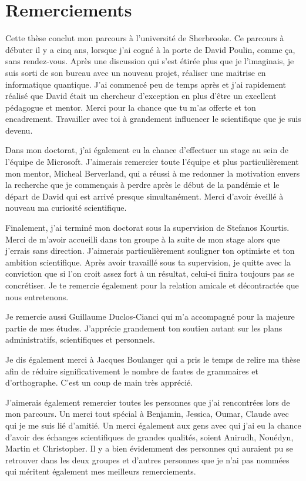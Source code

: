 \begin{comment}
\end{comment}

\chapter*{Remerciements}

Cette thèse conclut mon parcours à l'université de Sherbrooke.
Ce parcours à débuter il y a cinq ans,
lorsque j'ai cogné à la porte de David Poulin,
comme ça, sans rendez-vous.
Après une discussion qui s'est étirée plus que je l'imaginais,
je suis sorti de son bureau avec un nouveau projet, 
réaliser une maitrise en informatique quantique.
J'ai commencé peu de temps après et j'ai rapidement réalisé que David 
était un chercheur d'exception en plus d'être un excellent pédagogue et mentor.
Merci pour la chance que tu m'as offerte et ton encadrement.
Travailler avec toi à grandement influencer le scientifique que je suis devenu.

Dans mon doctorat,
j'ai également eu la chance d'effectuer un stage au sein de l'équipe de Microsoft.
J'aimerais remercier toute l'équipe et plus particulièrement mon mentor,
Micheal Berverland, qui a réussi à me redonner la motivation envers la recherche
que je commençais à perdre après le début de la pandémie et le départ de David qui est
arrivé presque simultanément.
Merci d'avoir éveillé à nouveau ma curiosité scientifique.

Finalement,
j'ai terminé mon doctorat sous la supervision de Stefanos Kourtis.
Merci de m'avoir accueilli dans ton groupe à la suite de mon stage alors que j'errais sans direction.
J'aimerais particulièrement souligner ton optimiste et ton ambition scientifique.
Après avoir travaillé sous ta supervision,
je quitte avec la conviction que si l'on croit assez fort à un résultat,
celui-ci finira toujours pas se concrétiser.
Je te remercie également pour la relation amicale et décontractée que nous entretenons.

Je remercie aussi Guillaume Duclos-Cianci qui m'a accompagné pour la majeure partie de mes études.
J'apprécie grandement ton soutien autant sur les plans administratifs, 
scientifiques et personnels.

Je dis également merci à Jacques Boulanger qui a pris le temps de relire ma thèse afin de réduire
significativement le nombre de fautes de grammaires et d'orthographe. C'est un coup de main très apprécié.  

J'aimerais également remercier toutes les personnes que j'ai rencontrées lors de mon parcours.
Un merci tout spécial à Benjamin, Jessica, Oumar, Claude avec qui
je me suis lié d'amitié.
Un merci également aux gens avec qui j'ai eu la chance d'avoir des échanges scientifiques
de grandes qualités, soient Anirudh, Nouédyn, Martin et Christopher.
Il y a bien évidemment des personnes qui auraient pu se retrouver dans les deux groupes
et d'autres personnes que je n'ai pas nommées qui méritent également mes meilleurs remerciements. 


